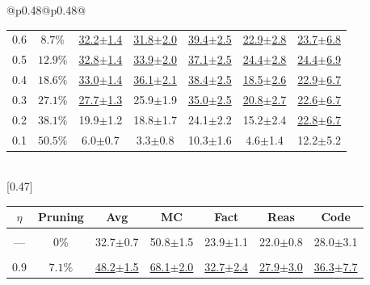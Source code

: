 \begin{table}[t]
\begin{tabular}{@{}p{}@{}p{}@{}}
{\begin{tabular}{c c c c c c c}
\rowcolor{white} 0.6 & $8.7\%$ & \underline{32.2{\scriptsize$\pm$1.4}} & \underline{31.8{\scriptsize$\pm$2.0}} & \underline{39.4{\scriptsize$\pm$2.5}} & \underline{22.9{\scriptsize$\pm$2.8}} & \underline{23.7{\scriptsize$\pm$6.8}} \\
\rowcolor{white} 0.5 & $12.9\%$ & \underline{32.8{\scriptsize$\pm$1.4}} & \underline{33.9{\scriptsize$\pm$2.0}} & \underline{37.1{\scriptsize$\pm$2.5}} & \underline{24.4{\scriptsize$\pm$2.8}} & \underline{24.4{\scriptsize$\pm$6.9}} \\
\rowcolor{white} 0.4 & $18.6\%$ & \underline{33.0{\scriptsize$\pm$1.4}} & \underline{36.1{\scriptsize$\pm$2.1}} & \underline{38.4{\scriptsize$\pm$2.5}} & \underline{18.5{\scriptsize$\pm$2.6}} & \underline{22.9{\scriptsize$\pm$6.7}} \\
\rowcolor{white} 0.3 & $27.1\%$ & \underline{27.7{\scriptsize$\pm$1.3}} & 25.9{\scriptsize$\pm$1.9} & \underline{35.0{\scriptsize$\pm$2.5}} & \underline{20.8{\scriptsize$\pm$2.7}} & \underline{22.6{\scriptsize$\pm$6.7}} \\
\rowcolor{white} 0.2 & $38.1\%$ & 19.9{\scriptsize$\pm$1.2} & 18.8{\scriptsize$\pm$1.7} & 24.1{\scriptsize$\pm$2.2} & 15.2{\scriptsize$\pm$2.4} & \underline{22.8{\scriptsize$\pm$6.7}} \\
\rowcolor{white} 0.1 & $50.5\%$ & 6.0{\scriptsize$\pm$0.7} & 3.3{\scriptsize$\pm$0.8} & 10.3{\scriptsize$\pm$1.6} & 4.6{\scriptsize$\pm$1.4} & 12.2{\scriptsize$\pm$5.2} \\
\bottomrule
\end{tabular}
} \\[0.3em]
[0.47\textwidth]{
\begin{tabular}{c c c c c c c}
\toprule
\textbf{$\eta$} & \textbf{Pruning} & \textbf{Avg} & \textbf{MC} & \textbf{Fact} & \textbf{Reas} & \textbf{Code} \\
\midrule
\rowcolor{lightgray} \multicolumn{7}{c}{\rule{0pt}{2.2ex}\textbf{Dense Model}\rule[-0.8ex]{0pt}{0pt}} \\
\rowcolor{white} --- & 0\% & 32.7{\scriptsize$\pm$0.7} & 50.8{\scriptsize$\pm$1.5} & 23.9{\scriptsize$\pm$1.1} & 22.0{\scriptsize$\pm$0.8} & 28.0{\scriptsize$\pm$3.1} \\
\midrule
\rowcolor{lightgray} \multicolumn{7}{c}{\rule{0pt}{2.2ex}\textbf{SubspacePath Pruner}\rule[-0.8ex]{0pt}{0pt}} \\
\rowcolor{white} 0.9 & $7.1\%$ & \underline{48.2{\scriptsize$\pm$1.5}} & \underline{68.1{\scriptsize$\pm$2.0}} & \underline{32.7{\scriptsize$\pm$2.4}} & \underline{27.9{\scriptsize$\pm$3.0}} & \underline{36.3{\scriptsize$\pm$7.7}} \\

\end{tabular}}
\end{tabular}
\end{table}
